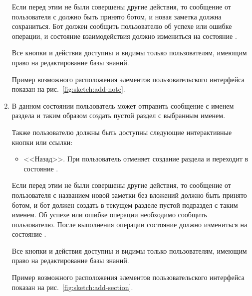 \begin{enumerate}
                Если перед этим не были совершены другие действия, то сообщение от пользователя
                с должно быть принято ботом, и новая заметка должна сохраниться.
                Бот должен сообщить пользователю об успехе или ошибке операции, и
                состояние взаимодействия должно измениться на состояние
                \hyperref[itm:req:ui:states:navx]
                {}.

                Все кнопки и действия доступны и видимы только пользователям, имеющим право на редактирование
                базы знаний.

                Пример возможного расположения элементов пользовательского интерфейса показан на
                рис.~\ref{fig:sketch:add-note}.

            \item \label{itm:req:ui:states:create-section}

                В данном состоянии пользователь может отправить сообщение с именем раздела и таким образом
                создать пустой раздел с выбранным именем.

                Также пользователю должны быть доступны следующие интерактивные кнопки или ссылки:
                \begin{itemize}
                    \item
                        <<Назад>>.
                        При  пользователь отменяет создание раздела и
                        переходит в состояние
                        \hyperref[itm:req:ui:states:navx]
                        {}.
                \end{itemize}
                
                Если перед этим не были совершены другие действия, то сообщение от пользователя
                с названием новой заметки без вложений должно быть принято ботом, и
                бот должен создать в текущем разделе пустой подраздел с таким именем.
                Об успехе или ошибке операции необходимо сообщить пользователю.
                После выполнения операции состояние должно измениться на
                состояние \hyperref[itm:req:ui:states:navx]
                {}.

                Все кнопки и действия доступны и видимы только пользователям, имеющим право на редактирование
                базы знаний.

                Пример возможного расположения элементов пользовательского интерфейса показан на
                рис.~\ref{fig:sketch:add-section}.
        \end{enumerate}

